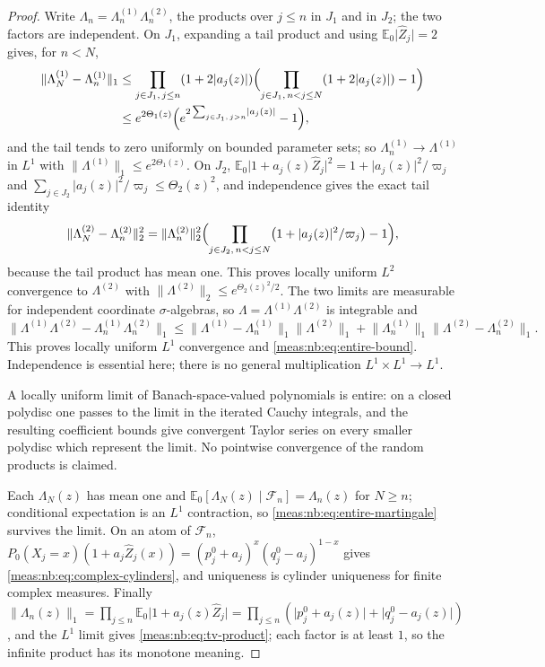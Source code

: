 \documentclass[11pt]{article}
\numberwithin{equation}{section}
\theoremstyle{definition}
\theoremstyle{remark}
\newcommand{\E}{\mathbb E}
\newcommand{\norm}[1]{\lVert#1\rVert}
\newcommand{\abs}[1]{\lvert#1\rvert}
\newcommand{\Zh}{\widehat Z}
\begin{document}
\begin{proof}
Write $\Lambda_n=\Lambda_n^{(1)}\Lambda_n^{(2)}$, the products over $j\le n$ in $J_1$ and in
$J_2$; the two factors are independent. On $J_1$, expanding a tail product and
using $\E_0\abs{\Zh_j}=2$ gives, for $n<N$,
\begin{align*}
 \norm{\Lambda_N^{(1)}-\Lambda_n^{(1)}}_1
 &\le\prod_{j\in J_1,\,j\le n}(1+2\abs{a_j(z)})
 \Bigl(\prod_{j\in J_1,\,n<j\le N}(1+2\abs{a_j(z)})-1\Bigr)\\
 &\le e^{2\Theta_1(z)}\Bigl(e^{2\sum_{j\in J_1,\,j>n}\abs{a_j(z)}}-1\Bigr),
\end{align*}
and the tail tends to zero uniformly on bounded parameter sets; so
$\Lambda_n^{(1)}\to\Lambda^{(1)}$ in $L^1$ with $\norm{\Lambda^{(1)}}_1\le e^{2\Theta_1(z)}$. On $J_2$,
$\E_0\abs{1+a_j(z)\Zh_j}^2=1+\abs{a_j(z)}^2/\varpi_j$ and
$\sum_{j\in J_2}\abs{a_j(z)}^2/\varpi_j\le\Theta_2(z)^2$, and independence gives the exact
tail identity
\begin{equation}\label{meas:nb:eq:L2-tail}
 \norm{\Lambda_N^{(2)}-\Lambda_n^{(2)}}_2^2
 =\norm{\Lambda_n^{(2)}}_2^2\Bigl(\prod_{j\in J_2,\,n<j\le N}\bigl(1+\abs{a_j(z)}^2/\varpi_j\bigr)-1\Bigr),
\end{equation}
because the tail product has mean one. This proves locally uniform $L^2$
convergence to $\Lambda^{(2)}$ with $\norm{\Lambda^{(2)}}_2\le e^{\Theta_2(z)^2/2}$. The two
limits are measurable for independent coordinate $\sigma$-algebras, so
$\Lambda=\Lambda^{(1)}\Lambda^{(2)}$ is integrable and
\[
 \norm{\Lambda^{(1)}\Lambda^{(2)}-\Lambda_n^{(1)}\Lambda_n^{(2)}}_1
 \le\norm{\Lambda^{(1)}-\Lambda_n^{(1)}}_1\norm{\Lambda^{(2)}}_1
 +\norm{\Lambda_n^{(1)}}_1\norm{\Lambda^{(2)}-\Lambda_n^{(2)}}_1 .
\]
This proves locally uniform $L^1$ convergence and \eqref{meas:nb:eq:entire-bound}.
Independence is essential here; there is no general multiplication
$L^1\times L^1\to L^1$.

A locally uniform limit of Banach-space-valued polynomials is entire: on a closed
polydisc one passes to the limit in the iterated Cauchy integrals, and the
resulting coefficient bounds give convergent Taylor series on every smaller
polydisc which represent the limit. No pointwise convergence of the random
products is claimed.

Each $\Lambda_N(z)$ has mean one and $\E_0[\Lambda_N(z)\mid\mathcal F_n]=\Lambda_n(z)$ for
$N\ge n$; conditional expectation is an $L^1$ contraction, so
\eqref{meas:nb:eq:entire-martingale} survives the limit. On an atom of $\mathcal F_n$,
$P_0(X_j=x)(1+a_j\Zh_j(x))=(p_j^0+a_j)^x(q_j^0-a_j)^{1-x}$ gives
\eqref{meas:nb:eq:complex-cylinders}, and uniqueness is cylinder uniqueness for finite
complex measures. Finally
$\norm{\Lambda_n(z)}_1=\prod_{j\le n}\E_0\abs{1+a_j(z)\Zh_j}
=\prod_{j\le n}(\abs{p_j^0+a_j(z)}+\abs{q_j^0-a_j(z)})$, and the $L^1$ limit gives
\eqref{meas:nb:eq:tv-product}; each factor is at least $1$, so the infinite product
has its monotone meaning.
\end{proof}
\end{document}
